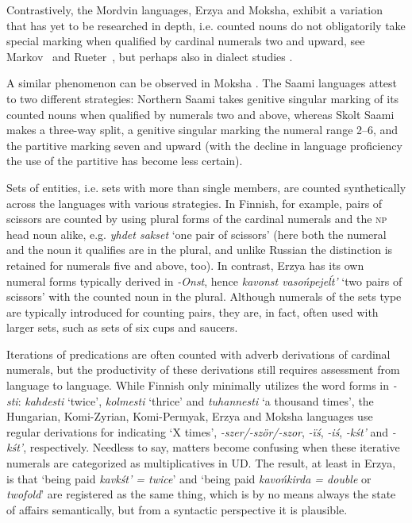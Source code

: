 \documentclass[free]{flammie}
\begin{document}
Contrastively, the Mordvin languages, Erzya and Moksha, exhibit a variation that
has yet to be researched in depth, i.e. counted nouns do not obligatorily take
special marking when qualified by cardinal numerals two and upward, see
Markov~\cite[42]{markov1961prialatyrski} and
Rueter~\cite[107]{rueter2013quantification}, but perhaps also in dialect
studies
\cite{ryabov2016erzdialectresearch,rueter2016erzisogloss,levina2021korpus,agafonova2021azorkschi}.

A similar phenomenon can be observed in Moksha \cite{rueterForthMordvin}.  The
Saami languages attest to two different strategies: Northern Saami takes
genitive singular marking of its counted nouns when qualified by numerals two
and above, whereas Skolt Saami makes a three-way split, a genitive singular
marking the numeral range 2--6, and the partitive marking seven and upward (with
the decline in language proficiency the use of the partitive has become less
certain).


Sets of entities, i.e. sets with more than single members, are counted
synthetically across the languages with various strategies.  In Finnish, for
example, pairs of scissors are counted by using plural forms of the cardinal
numerals and the \textsc{np} head noun alike, e.g. \textit{yhdet sakset} `one
pair of scissors' (here both the numeral and the noun it qualifies are in the
plural, and unlike Russian the distinction is retained for numerals five and
above, too).  In contrast, Erzya has its own numeral forms typically derived in
\textit{-Onst}, hence \textit{kavonst vasońpejeĺt'} `two pairs of scissors' with
the counted noun in the plural.  Although numerals of the sets type are
typically introduced for counting pairs, they are, in fact, often used with
larger sets, such as sets of six cups and saucers.

Iterations of predications are often counted with adverb derivations of cardinal
numerals, but the productivity of these derivations still requires assessment
from language to language. While Finnish only minimally utilizes the word forms
in \textit{-sti}: \textit{kahdesti} `twice', \textit{kolmesti} `thrice' and
\textit{tuhannesti} `a thousand times', the Hungarian, Komi-Zyrian,
Komi-Permyak, Erzya and Moksha languages use regular derivations for indicating
`X times', \textit{-szer/-ször/-szor}, \textit{-ïś}, \textit{-iś},
\textit{-kśt'} and \textit{-kśt'}, respectively. Needless to say, matters become
confusing when these iterative numerals are categorized as multiplicatives in
UD. The result, at least in Erzya, is that `being paid \textit{kavkśt' = twice}'
and `being paid \textit{kavońkirda = double} or \textit{twofold}' are registered
as the same thing, which is by no means always the state of affairs
semantically, but from a syntactic perspective it is plausible.
\end{document}
